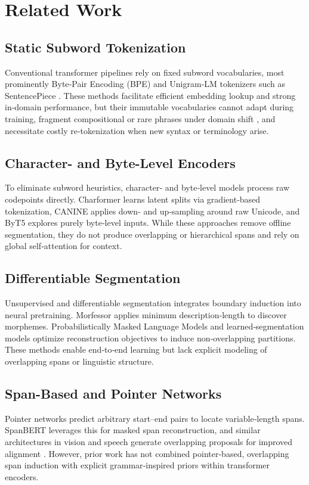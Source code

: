 \section{Related Work}

\subsection{Static Subword Tokenization}
Conventional transformer pipelines rely on fixed subword vocabularies, most prominently Byte‐Pair Encoding (BPE) \cite{sennrich2016bpe} and Unigram‐LM tokenizers such as SentencePiece \cite{kudo2018sentencepiece}. These methods facilitate efficient embedding lookup and strong in‐domain performance, but their immutable vocabularies cannot adapt during training, fragment compositional or rare phrases under domain shift \cite{galle2021respite}, and necessitate costly re‐tokenization when new syntax or terminology arise.

\subsection{Character- and Byte-Level Encoders}
To eliminate subword heuristics, character‐ and byte‐level models process raw codepoints directly. Charformer \cite{tay2021charformer} learns latent splits via gradient‐based tokenization, CANINE \cite{clark2021canine} applies down‐ and up‐sampling around raw Unicode, and ByT5 \cite{xue2022byt5} explores purely byte‐level inputs. While these approaches remove offline segmentation, they do not produce overlapping or hierarchical spans and rely on global self‐attention for context.

\subsection{Differentiable Segmentation}
Unsupervised and differentiable segmentation integrates boundary induction into neural pretraining. Morfessor \cite{creutz2005unsupervised} applies minimum description‐length to discover morphemes. Probabilistically Masked Language Models \cite{liu2022pmlm} and learned‐segmentation models \cite{liu2022learnedsegmentation} optimize reconstruction objectives to induce non‐overlapping partitions. These methods enable end‐to‐end learning but lack explicit modeling of overlapping spans or linguistic structure.

\subsection{Span-Based and Pointer Networks}
Pointer networks \cite{vinyals2015pointer} predict arbitrary start–end pairs to locate variable‐length spans. SpanBERT \cite{joshi2020spanbert} leverages this for masked span reconstruction, and similar architectures in vision and speech generate overlapping proposals for improved alignment \cite{ren2015faster,zach2019segmenter}. However, prior work has not combined pointer‐based, overlapping span induction with explicit grammar‐inspired priors within transformer encoders.

